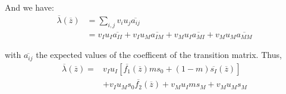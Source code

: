 And we have:
\begin{align*}
	\overline{\lambda}(\overline{z}) &= \sum_{i,j}{v_{i} u_{j} \overline{a_{ij}}} \\
	&= v_{I} u_{I} \overline{a_{II}} + v_{I} u_{M} \overline{a_{IM}} + v_{M} u_{I} \overline{a_{MI}} + v_{M} u_{M} \overline{a_{MM}}
\end{align*}

with $\overline{a_{ij}}$ the expected values of the coefficent of the transition matrix. Thus,
\begin{align}
	\overline{\lambda}(\overline{z}) = &v_{I} u_{I} \left[ \overline{f_{1}}(\overline{z})m s_{0} + (1-m)\overline{s_{I}}(\overline{z}) \right] \nonumber \\
	&+ v_{I} u_{M} s_0 \overline{f_{2}}(\overline{z})+ v_{M} u_{I} m s_M + v_{M} u_{M} s_M
\end{align}